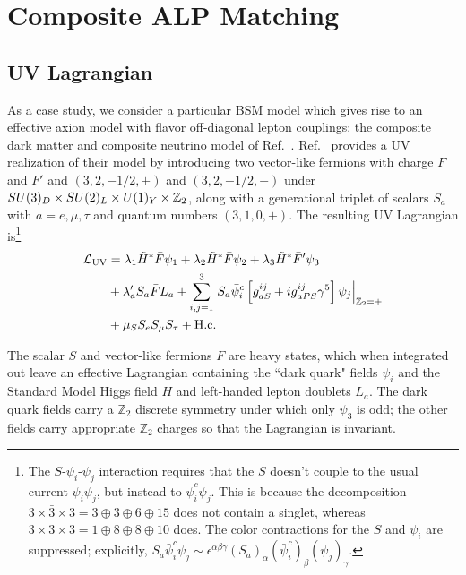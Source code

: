 \chapter{Composite ALP Matching}\label{ALP_match}

\section{UV Lagrangian \label{sec:model}}

As a case study, we consider a particular BSM model which gives rise to an effective axion model with flavor off-diagonal lepton couplings: the composite dark matter and composite neutrino model of Ref.~\cite{Davoudiasl:2017zws}. Ref.~\cite{Davoudiasl:2017zws} provides a UV realization of their model by introducing two vector-like fermions with charge $F$ and $F'$ and $(3, 2, -1/2, +)$ and $(3, 2, -1/2, -)$ under $SU(3)_D \times SU(2)_L\times U(1)_Y \times {\Bbb Z}_2$, along with a generational triplet of scalars $S_a$ with $a = e,\mu,\tau$ and quantum numbers $(3, 1, 0, +)$. The resulting UV Lagrangian is\footnote{The $S$-$\psi_i$-$\psi_j$ interaction requires that the $S$ doesn't couple to the usual current $\bar{\psi}_i\psi_j$, but instead to $\bar{\psi}_i^c \psi_j$. This is because the decomposition $3\times\bar{3}\times 3 = 3\oplus 3\oplus 6\oplus 15$ does not contain a singlet, whereas $3\times 3 \times 3 = 1 \oplus 8 \oplus 8 \oplus 10$ does. The color contractions for the $S$ and $\psi_i$ are suppressed; explicitly, $S_a \bar{\psi}_i^c \psi_j \sim \epsilon^{\alpha\beta\gamma}(S_a)_\alpha (\bar{\psi}^c_i)_\beta (\psi_j)_\gamma$. 
}
\begin{align}
    {\cal L}_{\rm UV} &= \lambda_1 \tilde{H}^*\bar{F}\psi_1 + \lambda_2\tilde{H}^*\bar{F}\psi_2 + \lambda_3 \tilde{H}^*\bar{F}'\psi_3 \nonumber \\
    &+ \lambda_a' S_a \bar{F}L_a + \sum_{i,j=1}^{3}\left.S_a\bar{\psi}_i^c\left[g_{aS}^{ij}+ig_{aPS}^{ij}\gamma^5\right]\psi_j\right|_{{\Bbb Z}_2 = +} \nonumber \\
    &+ \mu_S S_e S_\mu S_\tau + {\rm H.c.}\label{eq:UV_lag} 
\end{align}


The scalar $S$ and vector-like fermions $F$ are heavy states, which when integrated out leave an effective Lagrangian containing the ``dark quark" fields $\psi_i$ and the Standard Model Higgs field $H$ and left-handed lepton doublets $L_a$.  The dark quark fields carry a $\mathbb{Z}_2$ discrete symmetry under which only $\psi_3$ is odd; the other fields carry appropriate $\mathbb{Z}_2$ charges so that the Lagrangian is invariant. 

